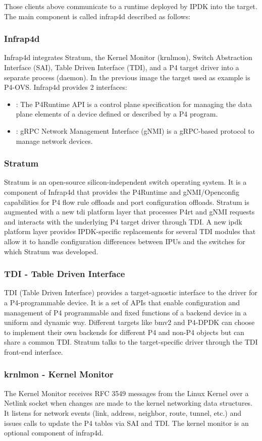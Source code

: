 \documentclass[../sn.tex]{subfiles}
\begin{document}
Those clients above communicate to a runtime deployed by IPDK into the target. The main component is called infrap4d described as follows:
\subsubsection{Infrap4d}
Infrap4d integrates Stratum, the Kernel Monitor (krnlmon), Switch Abstraction Interface (SAI), Table Driven Interface (TDI), and a P4 target driver into a separate process (daemon).
In the previous image the target used as example is P4-OVS.
Infrap4d provides 2 interfaces:
\begin{itemize}
    \item {}: The P4Runtime API is a control plane specification for managing the data plane elements of a device defined or described by a P4 program.
    \item {}: gRPC Network Management Interface (gNMI) is a gRPC-based protocol to manage network devices.
\end{itemize}
\subsubsection*{Stratum}
Stratum is an open-source silicon-independent switch operating system. It is a component of Infrap4d that provides the P4Runtime and gNMI/Openconfig capabilities for P4 flow rule offloads and port configuration offloads. Stratum is augmented with a new tdi platform layer that processes P4rt and gNMI requests and interacts with the underlying P4 target driver through TDI. A new ipdk platform layer provides IPDK-specific replacements for several TDI modules that allow it to handle configuration differences between IPUs and the switches for which Stratum was developed.
\subsubsection*{TDI - Table Driven Interface}
TDI (Table Driven Interface) provides a target-agnostic interface to the driver for a P4-programmable device. It is a set of APIs that enable configuration and management of P4 programmable and fixed functions of a backend device in a uniform and dynamic way. Different targets like bmv2 and P4-DPDK can choose to implement their own backends for different P4 and non-P4 objects but can share a common TDI. Stratum talks to the target-specific driver through the TDI front-end interface.
\subsubsection*{krnlmon - Kernel Monitor}
The Kernel Monitor receives RFC 3549 messages from the Linux Kernel over a Netlink socket when changes are made to the kernel networking data structures. It listens for network events (link, address, neighbor, route, tunnel, etc.) and issues calls to update the P4 tables via SAI and TDI. The kernel monitor is an optional component of infrap4d.
\end{document}
